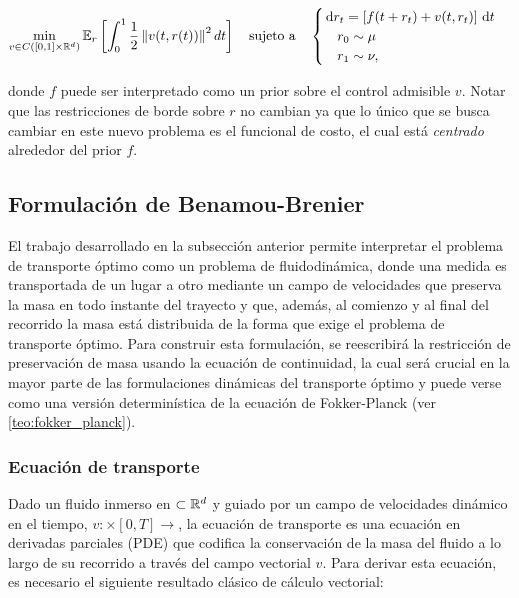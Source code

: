 \begin{equation}
	\label{eq:dynamic_kantorovich_4}
	\min_{v\in C([0,1]\times\mathbb{R}^d)} \mathbb{E}_{r}\left[\int_0^1 \frac{1}{2} \left\lVert v(t,r(t)) \right\rVert^2 dt\right]
	\quad \text{sujeto a} \quad
	\begin{cases}
		\,\operatorname{d}\! r_t = \left[f(t+r_t) + v(t,r_t)\right]\,\operatorname{d}\! t \\
		\quad r_0\sim\mu\\
		\quad r_1\sim\nu ,
	\end{cases}
\end{equation}

donde $f$ puede ser interpretado como un prior sobre el control admisible $v$. Notar que las restricciones de borde sobre $r$ no cambian ya que lo único que se busca cambiar en este nuevo problema es el funcional de costo, el cual está \textit{centrado} alrededor del prior $f$.

\subsection{Formulación de Benamou-Brenier}
\label{ot/dynamic/benamou_brenier}

El trabajo desarrollado en la subsección anterior permite interpretar el problema de transporte óptimo como un problema de fluidodinámica, donde una medida es transportada de un lugar a otro mediante un campo de velocidades que preserva la masa en todo instante del trayecto y que, además, al comienzo y al final del recorrido la masa está distribuida de la forma que exige el problema de transporte óptimo. Para construir esta formulación, se reescribirá la restricción de preservación de masa usando la ecuación de continuidad, la cual será crucial en la mayor parte de las formulaciones dinámicas del transporte óptimo y puede verse como una versión determinística de la ecuación de Fokker-Planck (ver \autoref{teo:fokker_planck}).

\subsubsection{Ecuación de transporte}

Dado un fluido inmerso en $\subset\mathbb{R}^d$ y guiado por un campo de velocidades dinámico en el tiempo, $v:\xspace\times[0,T]\to\xspace$, la ecuación de transporte es una ecuación en derivadas parciales (PDE) que codifica la conservación de la masa del fluido a lo largo de su recorrido a través del campo vectorial $v$. Para derivar esta ecuación, es necesario el siguiente resultado clásico de cálculo vectorial:

